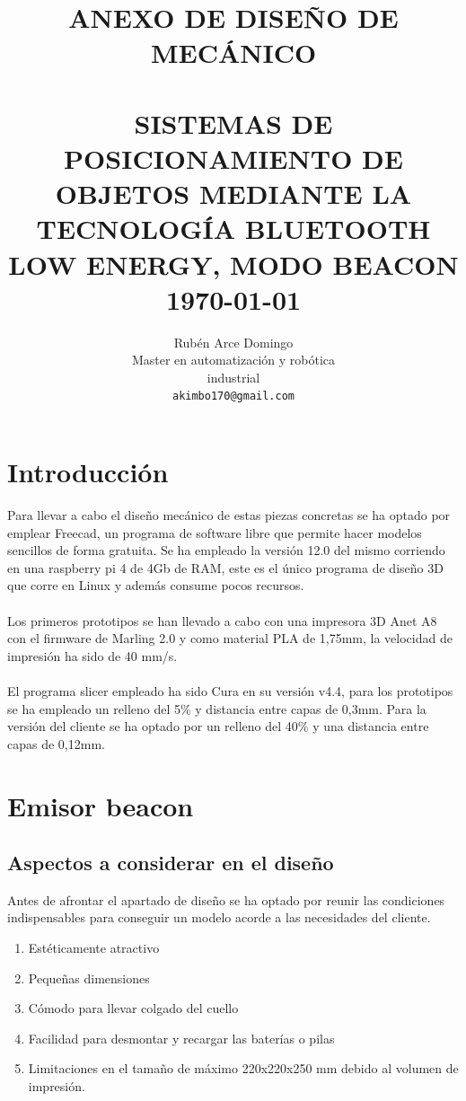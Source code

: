 \documentclass[paper=a4, fontsize=11pt,twoside]{scrartcl}
\title{	\normalsize \textsc{ANEXO DE DISEÑO DE MECÁNICO} 	%
		 	\\[2.0cm]								%
			\HRule{0.5pt} \\						%
			\LARGE \textbf{\uppercase{Sistemas de posicionamiento de objetos mediante la tecnología Bluetooth Low Energy, modo Beacon}}	%
			\HRule{2pt} \\ [0.5cm]		%
			\normalsize \today			%
		}
\author{
		Rubén Arce Domingo\\	
		Master en automatización y robótica\\	
		industrial\\
        \texttt{akimbo170@gmail.com} \\
}
\makeatletter
\def\printtitle{%
    {\centering \@title\par}}
\def\printauthor{%
    {\centering \large \@author}}
\makeatother
\begin{document}
\thispagestyle{empty}		%
\printtitle					%
  	\vfill
\printauthor				%
\newpage
\cleardoublepage
\tableofcontents
\listoffigures
\cleardoublepage
\pagestyle{fancy}
\section{Introducción}
    Para llevar a cabo el diseño mecánico de estas piezas concretas se ha optado por emplear Freecad, un
    programa de software libre que permite hacer modelos sencillos de forma gratuita.
    Se ha empleado la versión 12.0 del mismo corriendo en una raspberry pi 4 de 4Gb de RAM, este es el único
    programa de diseño 3D que corre en Linux  y además consume pocos recursos.
    \paragraph{}
    Los primeros prototipos se han llevado a cabo con una impresora 3D Anet A8 con el firmware de Marling
    2.0 y como material PLA de 1,75mm, la velocidad de impresión ha sido de 40 mm/s.
    \paragraph{}
    El programa slicer empleado ha sido Cura en su versión v4.4, para los prototipos se ha empleado un relleno del 5\% y distancia
    entre capas de 0,3mm. Para la versión del cliente se ha optado por un relleno del 40\% y una distancia entre capas de 0,12mm.
\section{Emisor beacon}
    \subsection{Aspectos a considerar en el diseño}
        Antes de afrontar el apartado de diseño se ha optado por reunir las condiciones indispensables para 
        conseguir un modelo acorde a las necesidades del cliente.
        \begin{enumerate}
            \item Estéticamente atractivo
            \item Pequeñas dimensiones
            \item Cómodo para llevar colgado del cuello
            \item Facilidad para desmontar y recargar las baterías o pilas
            \item Limitaciones en el tamaño de máximo 220x220x250 mm debido al volumen de impresión.
        \end{enumerate}
\end{document}
